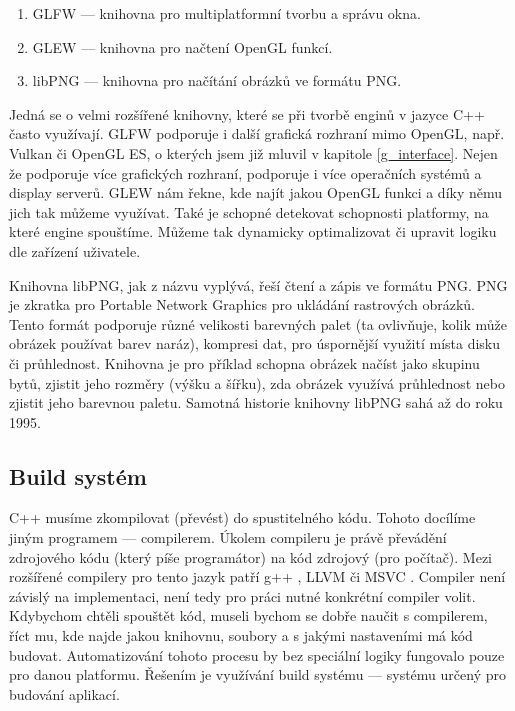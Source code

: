\documentclass[12pt]{article}
\begin{document}
\begin{enumerate}
    \item GLFW \cite{glfw} — knihovna pro multiplatformní tvorbu a správu okna.
    \item GLEW \cite{glew} — knihovna pro načtení OpenGL funkcí.
    \item libPNG \cite{libpng} — knihovna pro načítání obrázků ve formátu PNG.
\end{enumerate}

Jedná se o velmi rozšířené knihovny, které se při tvorbě enginů v jazyce C++ často využívají. GLFW podporuje i další grafická rozhraní mimo OpenGL, např. Vulkan či OpenGL ES, o kterých jsem již mluvil v kapitole \ref{g_interface}. Nejen že podporuje více grafických rozhraní, podporuje i více operačních systémů a display serverů. GLEW nám řekne, kde najít jakou OpenGL funkci a díky němu jich tak můžeme využívat. Také je schopné detekovat schopnosti platformy, na které engine spouštíme. Můžeme tak dynamicky optimalizovat či upravit logiku dle zařízení uživatele.

Knihovna libPNG, jak z názvu vyplývá, řeší čtení a zápis ve formátu PNG. PNG je zkratka pro Portable Network Graphics pro ukládání rastrových obrázků. Tento formát podporuje různé velikosti barevných palet (ta ovlivňuje, kolik může obrázek používat barev naráz), kompresi dat, pro úspornější využití místa disku či průhlednost. Knihovna je pro příklad schopna obrázek načíst jako skupinu bytů, zjistit jeho rozměry (výšku a šířku), zda obrázek využívá průhlednost nebo zjistit jeho barevnou paletu. Samotná historie knihovny libPNG sahá až do roku 1995.

\subsection{Build systém}

C++ musíme zkompilovat (převést) do spustitelného kódu. Tohoto docílíme jiným programem — compilerem. Úkolem compileru je právě převádění zdrojového kódu (který píše programátor) na kód zdrojový (pro počítač). Mezi rozšířené compilery pro tento jazyk patří g++ \cite{gnu_gcc}, LLVM \cite{llvm} či MSVC \cite{msvc}. Compiler není závislý na implementaci, není tedy pro práci nutné konkrétní compiler volit. Kdybychom chtěli spouštět kód, museli bychom se dobře naučit s compilerem, říct mu, kde najde jakou knihovnu, soubory a s jakými nastaveními má kód budovat. Automatizování tohoto procesu by bez speciální logiky fungovalo pouze pro danou platformu. Řešením je využívání build systému — systému určený pro budování aplikací.
\end{document}

